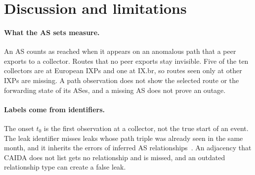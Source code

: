 \section{Discussion and limitations}\label{sec:disc}

\paragraph{What the AS sets measure.}
An AS counts as reached when it appears on an anomalous path that a peer exports to a collector.
Routes that no peer exports stay invisible.
Five of the ten collectors are at European IXPs and one at IX.br, so routes seen only at other IXPs are missing.
A path observation does not show the selected route or the forwarding state of its ASes, and a missing AS does not prove an outage.

\paragraph{Labels come from identifiers.}
The onset $t_0$ is the first observation at a collector, not the true start of an event.
The leak identifier misses leaks whose path triple was already seen in the same month, and it inherits the errors of inferred AS relationships~\cite{gao2001relationships,luckie2013relationships,jin2019problink}.
An adjacency that CAIDA does not list gets no relationship and is missed, and an outdated relationship type can create a false leak.

